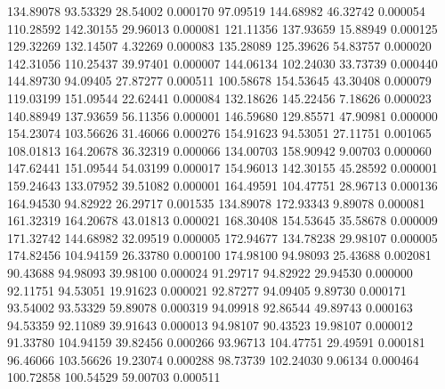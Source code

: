       134.89078       93.53329       28.54002       0.000170
       97.09519      144.68982       46.32742       0.000054
      110.28592      142.30155       29.96013       0.000081
      121.11356      137.93659       15.88949       0.000125
      129.32269      132.14507        4.32269       0.000083
      135.28089      125.39626       54.83757       0.000020
      142.31056      110.25437       39.97401       0.000007
      144.06134      102.24030       33.73739       0.000440
      144.89730       94.09405       27.87277       0.000511
      100.58678      154.53645       43.30408       0.000079
      119.03199      151.09544       22.62441       0.000084
      132.18626      145.22456        7.18626       0.000023
      140.88949      137.93659       56.11356       0.000001
      146.59680      129.85571       47.90981       0.000000
      154.23074      103.56626       31.46066       0.000276
      154.91623       94.53051       27.11751       0.001065
      108.01813      164.20678       36.32319       0.000066
      134.00703      158.90942        9.00703       0.000060
      147.62441      151.09544       54.03199       0.000017
      154.96013      142.30155       45.28592       0.000001
      159.24643      133.07952       39.51082       0.000001
      164.49591      104.47751       28.96713       0.000136
      164.94530       94.82922       26.29717       0.001535
      134.89078      172.93343        9.89078       0.000081
      161.32319      164.20678       43.01813       0.000021
      168.30408      154.53645       35.58678       0.000009
      171.32742      144.68982       32.09519       0.000005
      172.94677      134.78238       29.98107       0.000005
      174.82456      104.94159       26.33780       0.000100
      174.98100       94.98093       25.43688       0.002081
       90.43688       94.98093       39.98100       0.000024
       91.29717       94.82922       29.94530       0.000000
       92.11751       94.53051       19.91623       0.000021
       92.87277       94.09405        9.89730       0.000171
       93.54002       93.53329       59.89078       0.000319
       94.09918       92.86544       49.89743       0.000163
       94.53359       92.11089       39.91643       0.000013
       94.98107       90.43523       19.98107       0.000012
       91.33780      104.94159       39.82456       0.000266
       93.96713      104.47751       29.49591       0.000181
       96.46066      103.56626       19.23074       0.000288
       98.73739      102.24030        9.06134       0.000464
      100.72858      100.54529       59.00703       0.000511
